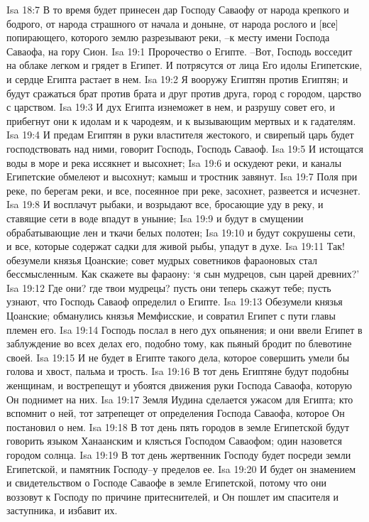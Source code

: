 Isa 18:7  В то время будет принесен дар Господу Саваофу от народа крепкого и бодрого, от народа страшного от начала и доныне, от народа рослого и [все] попирающего, которого землю разрезывают реки, --к месту имени Господа Саваофа, на гору Сион.
Isa 19:1  Пророчество о Египте. --Вот, Господь восседит на облаке легком и грядет в Египет. И потрясутся от лица Его идолы Египетские, и сердце Египта растает в нем.
Isa 19:2  Я вооружу Египтян против Египтян; и будут сражаться брат против брата и друг против друга, город с городом, царство с царством.
Isa 19:3  И дух Египта изнеможет в нем, и разрушу совет его, и прибегнут они к идолам и к чародеям, и к вызывающим мертвых и к гадателям.
Isa 19:4  И предам Египтян в руки властителя жестокого, и свирепый царь будет господствовать над ними, говорит Господь, Господь Саваоф.
Isa 19:5  И истощатся воды в море и река иссякнет и высохнет;
Isa 19:6  и оскудеют реки, и каналы Египетские обмелеют и высохнут; камыш и тростник завянут.
Isa 19:7  Поля при реке, по берегам реки, и все, посеянное при реке, засохнет, развеется и исчезнет.
Isa 19:8  И восплачут рыбаки, и возрыдают все, бросающие уду в реку, и ставящие сети в воде впадут в уныние;
Isa 19:9  и будут в смущении обрабатывающие лен и ткачи белых полотен;
Isa 19:10  и будут сокрушены сети, и все, которые содержат садки для живой рыбы, упадут в духе.
Isa 19:11  Так! обезумели князья Цоанские; совет мудрых советников фараоновых стал бессмысленным. Как скажете вы фараону: `я сын мудрецов, сын царей древних?'
Isa 19:12  Где они? где твои мудрецы? пусть они теперь скажут тебе; пусть узнают, что Господь Саваоф определил о Египте.
Isa 19:13  Обезумели князья Цоанские; обманулись князья Мемфисские, и совратил Египет с пути главы племен его.
Isa 19:14  Господь послал в него дух опьянения; и они ввели Египет в заблуждение во всех делах его, подобно тому, как пьяный бродит по блевотине своей.
Isa 19:15  И не будет в Египте такого дела, которое совершить умели бы голова и хвост, пальма и трость.
Isa 19:16  В тот день Египтяне будут подобны женщинам, и вострепещут и убоятся движения руки Господа Саваофа, которую Он поднимет на них.
Isa 19:17  Земля Иудина сделается ужасом для Египта; кто вспомнит о ней, тот затрепещет от определения Господа Саваофа, которое Он постановил о нем.
Isa 19:18  В тот день пять городов в земле Египетской будут говорить языком Ханаанским и клясться Господом Саваофом; один назовется городом солнца.
Isa 19:19  В тот день жертвенник Господу будет посреди земли Египетской, и памятник Господу--у пределов ее.
Isa 19:20  И будет он знамением и свидетельством о Господе Саваофе в земле Египетской, потому что они воззовут к Господу по причине притеснителей, и Он пошлет им спасителя и заступника, и избавит их.

